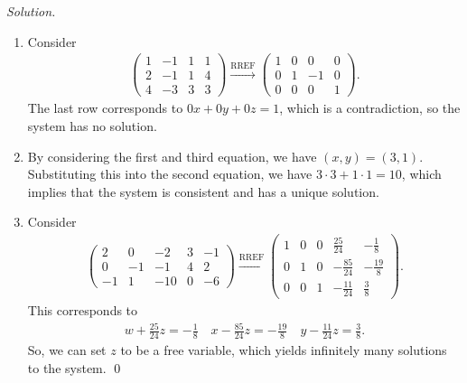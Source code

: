 \documentclass[12pt]{article}
\begin{document}
\emph{Solution.}\begin{enumerate}[label=\textbf{(\alph*)}]
    \itemsep 0em
    \item Consider \begin{align*}
        \begin{pmatrix}
            1 & -1 & 1 & 1 \\ 2 & -1 & 1 & 4 \\ 4 & -3 & 3 & 3
        \end{pmatrix}\xrightarrow{\text{RREF}}\begin{pmatrix}
            1 & 0 &0&0\\0&1&-1&0\\0&0&0&1
        \end{pmatrix}.
    \end{align*}
    The last row corresponds to $0x+0y+0z=1$, which is a contradiction, so the system has no solution.
    \item By considering the first and third equation, we have $\left(x,y\right)=\left(3,1\right)$. Substituting this into the second equation, we have $3\cdot 3 +1\cdot 1=10$, which implies that the system is consistent and has a unique solution.
    \item Consider \begin{align*}
        \begin{pmatrix}
            2&0&-2&3&-1\\0&-1&-1&4&2\\-1&1&-10&0&-6
        \end{pmatrix}\xrightarrow{\text{RREF}}\begin{pmatrix}1&0&0&\frac{25}{24}&-\frac{1}{8}\\ 0&1&0&-\frac{85}{24}&-\frac{19}{8}\\ 0&0&1&-\frac{11}{24}&\frac{3}{8}\end{pmatrix}.
    \end{align*}
    This corresponds to \begin{align*}
        w+\frac{25}{24}z=-\frac{1}{8}\quad x-\frac{85}{24}z=-\frac{19}{8}\quad y-\frac{11}{24}z=\frac{3}{8}.
    \end{align*}
    So, we can set $z$ to be a free variable, which yields infinitely many solutions to the system. \qed 
\end{enumerate}
\end{document}

